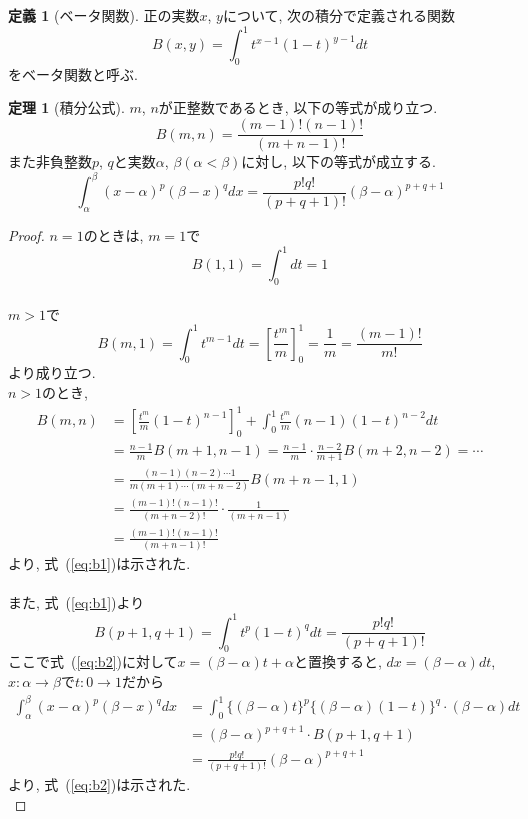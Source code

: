 \documentclass[a4paper,12pt,uplatex,dvipdfmx]{jsarticle}
\theoremstyle{definition}
\newtheorem{definition}{定義}
\newtheorem{theorem}{定理}
\begin{document}
\begin{definition}[ベータ関数]
    正の実数$x$, $y$について, 次の積分で定義される関数
    \[
        B(x, y) = \int_0^1 t^{x-1}(1-t)^{y-1} dt
    \]
    をベータ関数と呼ぶ.
\end{definition}

\begin{theorem}[積分公式]
    $m$, $n$が正整数であるとき, 以下の等式が成り立つ.
    \begin{equation}
        B(m, n) = \frac{(m-1)!(n-1)!}{(m+n-1)!}
        \label{eq:b1}
    \end{equation}
    また非負整数$p$, $q$と実数$\alpha$, $\beta(\alpha < \beta)$に対し, 以下の等式が成立する.
    \begin{equation}
        \int_{\alpha}^{\beta}(x-\alpha)^{p}(\beta-x)^{q} dx = \frac{p!q!}{(p+q+1)!}(\beta-\alpha)^{p+q+1}
        \label{eq:b2}
    \end{equation}
\end{theorem}

\begin{proof}
    $n = 1$のときは, $m = 1$で
    \[
        B(1, 1) = \int_0^1 dt = 1
    \] \\
    $m > 1$で
    \[
        B(m, 1) = \int_0^1 t^{m-1} dt = \left[\frac{t^m}{m}\right]_0^1 = \frac{1}{m} = \frac{(m-1)!}{m!}
    \]
    より成り立つ. \\
    $n > 1$のとき, 
    \begin{align*}
        B(m, n) & = \left[\frac{t^m}{m}(1-t)^{n-1}\right]_0^1 + \int_0^1 \frac{t^m}{m}(n-1)(1-t)^{n-2} dt \\
        & = \frac{n-1}{m}B(m+1, n-1)
        = \frac{n-1}{m}\cdot\frac{n-2}{m+1}B(m+2, n-2) = \cdots \\
        & = \frac{(n-1)(n-2)\cdots 1}{m(m+1)\cdots(m+n-2)}B(m+n-1, 1) \\
        & = \frac{(m-1)!(n-1)!}{(m+n-2)!}\cdot\frac{1}{(m+n-1)} \\
        & = \frac{(m-1)!(n-1)!}{(m+n-1)!}
    \end{align*}
    より, 式~(\ref{eq:b1})は示された. \\\\
    また, 式~(\ref{eq:b1})より
    \[
        B(p+1, q+1) = \int_0^1 t^p(1-t)^q dt = \frac{p!q!}{(p+q+1)!}
    \]
    ここで式~(\ref{eq:b2})に対して$x = (\beta - \alpha)t + \alpha$と置換すると, $dx = (\beta - \alpha)dt$, $x:\alpha \to \beta$で$t:0 \to 1$だから
    \begin{align*}
        \int_{\alpha}^{\beta}(x-\alpha)^{p}(\beta-x)^{q} dx
        & = \int_0^1 \{(\beta - \alpha)t\}^p\{(\beta - \alpha)(1-t)\}^q \cdot (\beta - \alpha)dt \\
        & = (\beta - \alpha)^{p+q+1} \cdot B(p+1, q+1) \\
        & = \frac{p!q!}{(p+q+1)!}(\beta-\alpha)^{p+q+1}
    \end{align*}
    より, 式~(\ref{eq:b2})は示された. \qedhere\\
\end{proof}
\end{document}
